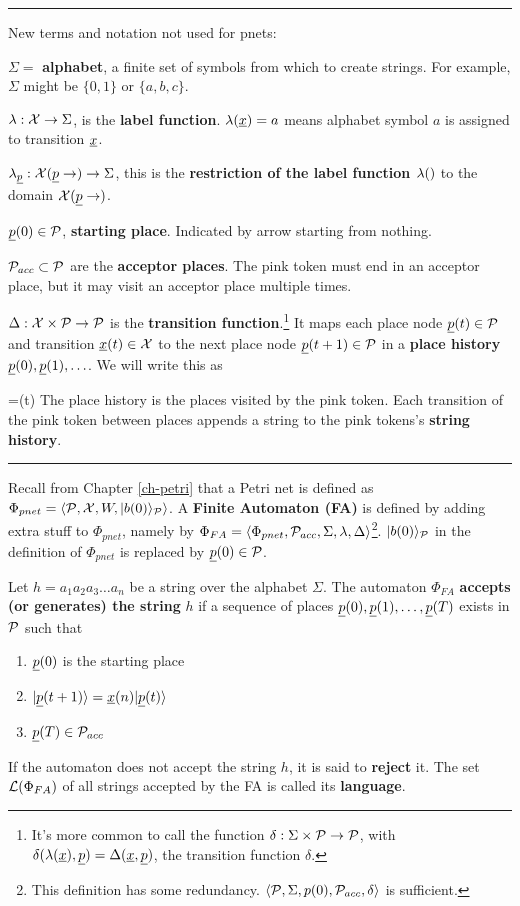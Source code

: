 \hrule
New terms and notation not used for pnets:

$\Sigma=$ {\bf alphabet}, a finite set of symbols
from which to create strings. For example,
$\Sigma$ might be $\{0, 1\}$ or $\{a, b, c\}$.

$\lambda:{\cal X}\rightarrow\Sigma$, is the {\bf label function}. $\lam(\rvx)=a$ means alphabet symbol $a$ is assigned to transition $\rvx$.  


$\lam_\rvp:\calx(\rvp\rarrow)\rarrow\Sigma$, this is the {\bf restriction of the label function $\lambda()$}
to the domain $\calx(\rvp\rarrow)$.


$\rvp(0)\in \calp$, {\bf starting place}. Indicated by arrow starting from nothing.



${\cal P}_{acc}\subset {\cal P}$ are the 
{\bf acceptor places}. The pink token must end in an acceptor place, but it may visit
an acceptor place multiple times.


$\Delta:{\cal X}\times{\cal P}\rightarrow {\cal P}$ is the 
{\bf transition function}.\footnote{It's more common to call the function $\delta:\Sigma\times{\cal P}\rightarrow {\cal P}$, with $\delta(\lam(\rvx), \rvp)=\Delta(\rvx, \rvp)$, 
the
transition function $\delta$.}
It maps each place node $\rvp(t)\in\calp$ and transition $\rvx(t)\in\calx$ to the next place node $\rvp(t+1)\in\calp$ in a {\bf place history} $\rvp(0), \rvp(1), \ldots$. We will write this as

\beq
{}=\rvx(t)
\eeq
The place history is the places visited by the pink token. Each transition of
the pink token  between places appends a string
to the pink tokens's {\bf string history}.




\hrule
Recall from Chapter \ref{ch-petri} that a Petri net is defined as $\Phi_{pnet} = \left\langle{\cal P}, {\cal X}, W,|b(0)\rangle_{\cal P}\right\rangle$.
A {\bf Finite Automaton (FA)}
is defined by adding extra stuff to
$\Phi_{pnet}$, namely by
$\Phi_{FA}=\left\langle\Phi_{pnet},{\cal P}_{acc}, \Sigma, \lambda, \Delta\right\rangle$\footnote{This definition has some redundancy.  
$\left\langle{\cal P}, \Sigma, p(0), {\cal P}_{acc}, \delta\right\rangle$
is sufficient.}.
$|b(0)\rangle_{\cal P}$ in the definition
of $\Phi_{pnet}$ is replaced by
$\rvp(0)\in\calp$.

Let $h=a_1a_2a_3\ldots a_n$ be a string
over the alphabet $\Sigma$.
The automaton $\Phi_{FA}$ {\bf accepts (or generates) the string} $h$
if a sequence of places $\rvp(0), \rvp(1), \ldots, \rvp(T)$ exists
in ${\cal P}$ such that 
\begin{enumerate}
\item $\rvp(0)$  is the starting place
\item $\ket{\rvp(t+1) }= \rvx(n)\ket{\rvp(t)}$
\item $\rvp(T)\in \calp_{acc}$
\end{enumerate}
If the automaton does not accept the string $h$,
it is said to {\bf reject} it. The set ${\cal L}(\Phi_{FA})$ of all strings 
accepted by the FA is called its {\bf language}.

